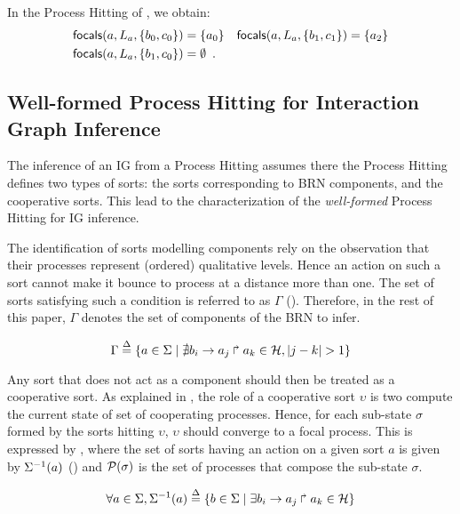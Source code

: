 \begin{example*}
In the Process Hitting of , we obtain:
\begin{align*}
\mathsf{focals}(a,L_a,\{b_0,c_0\}) &= \{ a_0 \}
&
\mathsf{focals}(a,L_a,\{b_1,c_1\}) &= \{ a_2 \}\\
\mathsf{focals}(a,L_a,\{b_1,c_0\}) &= \emptyset\enspace.
\end{align*}
\end{example*}

\subsection{Well-formed Process Hitting for Interaction Graph Inference}\label{ssec:wf}

The inference of an IG from a Process Hitting assumes there the Process Hitting defines two types of
sorts:
the sorts corresponding to BRN components, and the cooperative sorts.
This lead to the characterization of the \emph{well-formed} Process Hitting for IG inference.

The identification of sorts modelling components rely on the observation that their processes
represent (ordered) qualitative levels.
Hence an action on such a sort cannot make it bounce to process at a distance more than one.
The set of sorts satisfying such a condition is referred to as $\Gamma$
().
Therefore, in the rest of this paper, $\Gamma$ denotes the set of components of the BRN to infer.

\begin{equation}
\Gamma \stackrel{\Delta}= \{a \in \Sigma \mid \nexists b_i\rightarrow a_j\Rsh a_k \in \mathcal{H}, |j - k| > 1\} \\
\label{eq:PH-components}
\end{equation}

Any sort that does not act as a component should then be treated as a cooperative sort.
As explained in , the role of a cooperative sort $\upsilon$ is two compute the current
state of set of cooperating processes.
Hence, for each sub-state $\sigma$ formed by the sorts hitting $\upsilon$, $\upsilon$ should
converge to a focal process.
This is expressed by , where
the set of sorts having an action on a given sort $a$ is given by 
$\Sigma^{-1}(a)$ ()
and $\mathcal{P}(\sigma)$ is the set of processes that compose the sub-state $\sigma$.

\begin{equation}
\forall a \in \Sigma, \Sigma^{-1}(a) \stackrel{\Delta}= \{b \in \Sigma \mid \exists b_i\rightarrow a_j\Rsh a_k\in\mathcal{H} \}
\label{eq:ph_direct_predec}
\end{equation}

